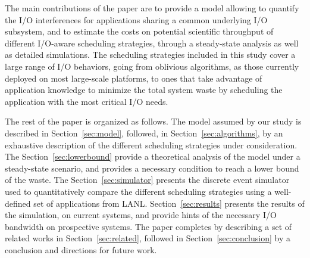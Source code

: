 The main contributions of the paper are to provide a model allowing to quantify
the I/O interferences for applications sharing a common underlying I/O
subsystem, and to estimate the costs on potential scientific throughput of different I/O-aware
scheduling strategies, through
a steady-state analysis as well as detailed simulations.
The scheduling strategies included in this study cover a
large range of I/O behaviors, going from oblivious algorithms, as those
currently deployed on most large-scale platforms, to ones that take advantage of
application knowledge to minimize the total system waste by scheduling the
application with the most critical I/O needs.

The rest of the paper is organized as follows. The model assumed by our study is
described in  Section~\ref{sec:model}, followed, in
Section~\ref{sec:algorithms}, by an exhaustive description of the different
scheduling strategies under consideration. The Section~\ref{sec:lowerbound}
provide a theoretical analysis of the model under a steady-state scenario, and
provides a necessary condition to reach a lower bound of the waste. The
Section~\ref{sec:simulator} presents the discrete event simulator used to
quantitatively compare the different scheduling strategies using a well-defined
set of applications from LANL. Section~\ref{sec:results} presents the results of
the simulation, on current systems, and provide hints of the necessary I/O
bandwidth on prospective systems. The paper completes by describing a set of
related works in Section~\ref{sec:related}, followed in
Section~\ref{sec:conclusion} by a conclusion and directions for future work.

